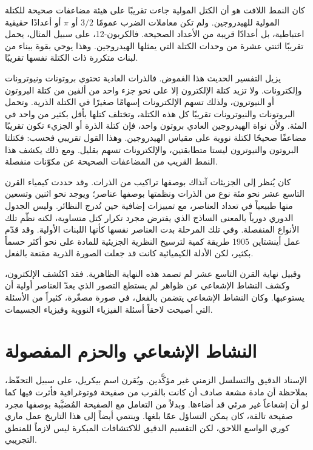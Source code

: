 كان النمط اللافت هو أن الكتل المولية جاءت تقريبًا على هيئة مضاعفات صحيحة للكتلة المولية للهيدروجين. ولم تكن معاملات الضرب عمومًا \(3/2\) أو \(\pi\) أو أعدادًا حقيقية اعتباطية، بل أعدادًا قريبة من الأعداد الصحيحة. فالكربون-12، على سبيل المثال، يحمل تقريبًا اثنتي عشرة من وحدات الكتلة التي يمثلها الهيدروجين. وهذا يوحي بقوة ببناء من لبنات متكررة ذات الكتلة نفسها تقريبًا.

يزيل التفسير الحديث هذا الغموض. فالذرات العادية تحتوي بروتونات ونيوترونات وإلكترونات. ولا تزيد كتلة الإلكترون إلا على نحو جزء واحد من ألفين من كتلة البروتون أو النيوترون، ولذلك تسهم الإلكترونات إسهامًا صغيرًا في الكتلة الذرية. وتحمل البروتونات والنيوترونات تقريبًا كل هذه الكتلة، وتختلف كتلها بأقل بكثير من واحد في المئة. ولأن نواة الهيدروجين العادي بروتون واحد، فإن كتلة الذرة أو الجزيء تكون تقريبًا مضاعفًا صحيحًا لكتلة نووية على مقياس الهيدروجين. وهذا القول تقريبي فحسب: فكتلتا البروتون والنيوترون ليستا متطابقتين، والإلكترونات تسهم بقليل. ومع ذلك يكشف هذا النمط القريب من المضاعفات الصحيحة عن مكوّنات منفصلة.

كان يُنظر إلى الجزيئات آنذاك بوصفها تراكيب من الذرات. وقد حددت كيمياء القرن التاسع عشر نحو مئة نوع من الذرات ونظمتها بوصفها عناصر؛ ويوجد نحو اثنين وتسعين منها طبيعياً في تعداد العناصر، مع تمييزات إضافية حين تُدرج النظائر. وليس الجدول الدوري دورياً بالمعنى الساذج الذي يفترض مجرد تكرار كتل متساوية، لكنه نظّم تلك الأنواع المنفصلة. وفي تلك المرحلة بدت العناصر نفسها كأنها اللبنات الأولية. وقد قدّم عمل أينشتاين 1905 طريقة كمية لترسيخ النظرية الجزيئية للمادة على نحو أكثر حسماً بكثير، لكن الأدلة الكيميائية كانت قد جعلت الصورة الذرية مقنعة بالفعل.

وقبيل نهاية القرن التاسع عشر لم تصمد هذه النهاية الظاهرية. فقد اكتُشف الإلكترون، وكشف النشاط الإشعاعي عن ظواهر لم يستطع التصور الذي يعدّ العناصر أولية أن يستوعبها. وكان النشاط الإشعاعي يتضمن بالفعل، في صورة مصغّرة، كثيراً من الأسئلة التي أصبحت لاحقاً أسئلة الفيزياء النووية وفيزياء الجسيمات.

\section{النشاط الإشعاعي والحزم المفصولة}

الإسناد الدقيق والتسلسل الزمني غير مؤكَّدين. ويُقرن اسم بيكريل، على سبيل التحفّظ، بملاحظة أن مادة مشعة صادف أن كانت بالقرب من صفيحة فوتوغرافية فأثرت فيها كما لو أن إشعاعاً غير مرئي قد أضاءها. وبدلاً من التعامل مع الصفيحة المُضبَّبة بوصفها مجرد صفيحة تالفة، كان يمكن التساؤل عمّا بلغها. وينتمي أيضاً إلى هذا التاريخ عمل ماري كوري الواسع اللاحق، لكن التقسيم الدقيق للاكتشافات المبكرة ليس لازماً للمنطق التجريبي.

